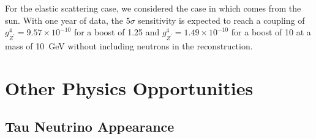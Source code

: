For the elastic scattering case, we considered the case in which  comes from the sun. 
With one year of data, the $5\sigma$ sensitivity is expected to reach a coupling of $g_{Z^\prime}^4 = 9.57 \times 10^{-10}$ for a boost of 1.25 and $g_{Z^\prime}^4 = 1.49 \times 10^{-10}$ for a boost of 10 at a  mass of \SI{10}{GeV} without including neutrons in the reconstruction.



\section{Other  Physics Opportunities}
\label{sec:otheropps}

\subsection{Tau Neutrino Appearance} 



